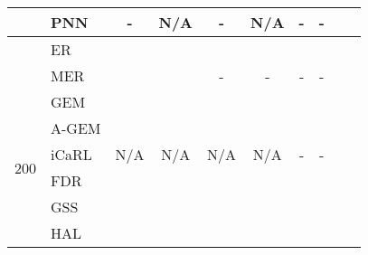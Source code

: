 \documentclass{article}
\begin{document}
\begin{table}[H]
{{\begin{tabular}{clcccccccc}
                        & PNN                   & -                                                 & N/A                                               & -                                                 & N/A                                               & -                                                 & -                       \\
\midrule                                                        
                        & ER                    & \tiny{}                          & \tiny{}                           & \tiny{}                          &  \tiny{}                           &  \tiny{} & \tiny{} \\
                        & MER                   & \tiny{}                          & \tiny{}                           & -                                                 & -                                                 & -                                                 & -                       \\
                        & GEM                   & \tiny{}                          & \tiny{} &  \tiny{}&  \tiny{}                           &  \tiny{}                           & \tiny{}                           \\
                        & A-GEM                 & \tiny{} &  \tiny{}                          & \tiny{}                          & \tiny{}                           &  \tiny{}                           & \tiny{}\\
\multirow{2}{*}{200}    & iCaRL                 & N/A                                               & N/A                                               & N/A                                               & N/A                                               & -                                                 & -                       \\
                        & FDR                   & \tiny{}                          & \tiny{}                           & \tiny{}                          & \tiny{}                           & \tiny{}                           & \tiny{} \\
                        & GSS                   & \tiny{}                          &  \tiny{}                           & \tiny{}                          & \tiny{}  &  \tiny{}                           & \tiny{} \\
                        & HAL                   & \tiny{}                          & \tiny{}                           & \tiny{}                          & \tiny{}                           & \tiny{}                           & \tiny{}  \\

\end{tabular}}}
\end{table}
\end{document}
